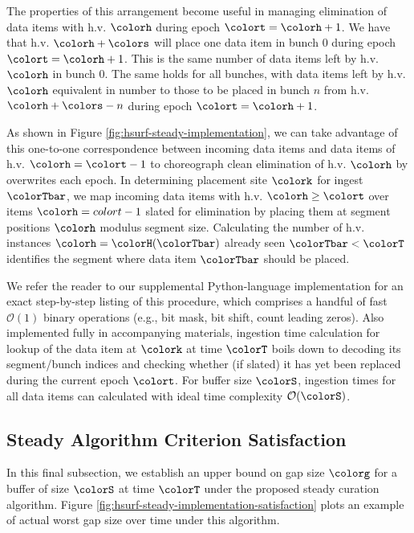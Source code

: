 

The properties of this arrangement become useful in managing elimination of data items with h.v. $\colorh$ during epoch $\colort=\colorh + 1$.
We have that h.v. $\colorh + \colors$ will place one data item in bunch 0 during epoch $\colort=\colorh + 1$.
This is the same number of data items left by h.v. $\colorh$ in bunch 0.
The same holds for all bunches, with data items left by h.v. $\colorh$ equivalent in number to those to be placed in bunch $n$ from h.v. $\colorh + \colors - n$ during epoch $\colort = \colorh + 1$.

As shown in Figure \ref{fig:hsurf-steady-implementation}, we can take advantage of this one-to-one correspondence between incoming data items and data items of h.v. $\colorh=\colort-1$ to choreograph clean elimination of h.v. $\colorh$ by overwrites each epoch.
In determining placement site $\colork$ for ingest $\colorTbar$, we map incoming data items with h.v. $\colorh \geq \colort$ over items $\colorh = colort - 1$ slated for elimination by placing them at segment positions $\colorh$ modulus segment size.
Calculating the number of h.v. instances $\colorh = \colorH(\colorTbar)$ already seen $\colorTbar < \colorT$ identifies the segment where data item $\colorTbar$ should be placed.



We refer the reader to our supplemental Python-language implementation for an exact step-by-step listing of this procedure, which comprises a handful of fast $\mathcal{O}(1)$ binary operations (e.g., bit mask, bit shift, count leading zeros).
Also implemented fully in accompanying materials, ingestion time calculation for lookup of the data item at $\colork$ at time $\colorT$ boils down to decoding its segment/bunch indices and checking whether (if slated) it has yet been replaced during the current epoch $\colort$.
For buffer size $\colorS$, ingestion times for all data items can calculated with ideal time complexity $\mathcal{O}(\colorS)$.

\subsection{Steady Algorithm Criterion Satisfaction}
\label{sec:stready-satisfaction}

In this final subsection, we establish an upper bound on gap size $\colorg$ for a buffer of size $\colorS$ at time $\colorT$ under the proposed steady curation algorithm.
Figure \ref{fig:hsurf-steady-implementation-satisfaction} plots an example of actual worst gap size over time under this algorithm.



